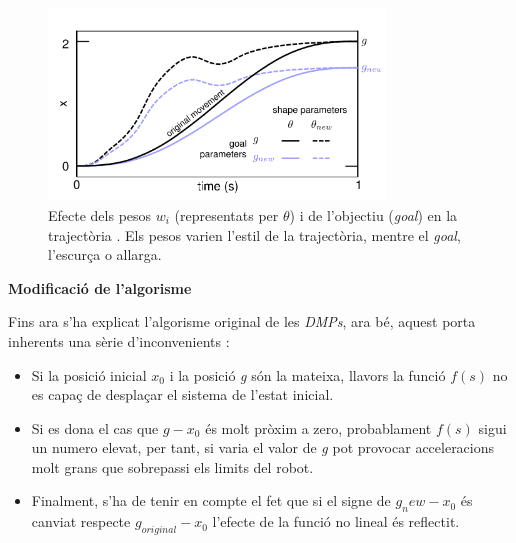 \documentclass[12pt,a4paper,final,twoside]{article}
\begin{document}
\begin{figure}[tb]
\centering
\includegraphics[width=0.8\textwidth]{Imatges/effect-of-shape-parameters}
\caption[Efecte dels pesos $w_i$ (representats per $\theta$) i de l'objectiu (\textit{goal})]{Efecte dels pesos $w_i$ (representats per $\theta$) i de l'objectiu (\textit{goal}) en la trajectòria \cite{Stulp2011}. Els pesos varien l'estil de la trajectòria, mentre el \textit{goal}, l'escurça o allarga.}
\label{fig:ffect-of-shape-parameters}
\end{figure}


\vspace{20pt}
\textbf{Modificació de l'algorisme}

Fins ara s'ha explicat l'algorisme original de les \textit{DMPs}, ara bé, aquest porta inherents una sèrie d'inconvenients \cite{Pastor2009}:

\begin{itemize}
\item Si la posició inicial $x_0$ i la posició \textit{g} són la mateixa, llavors la funció $f(s)$ no es capaç de desplaçar el sistema de l'estat inicial.

\item Si es dona el cas que $g-x_0$ és molt pròxim a zero, probablament $f(s)$ sigui un numero elevat, per tant, si varia el valor de \textit{g} pot provocar acceleracions molt grans que sobrepassi els limits del robot.

\item Finalment, s'ha de tenir en compte el fet que si el signe de $g_new - x_0$ és canviat respecte $g_{original} - x_0$ l'efecte de la funció no lineal és reflectit.
\end{itemize}
\end{document}
